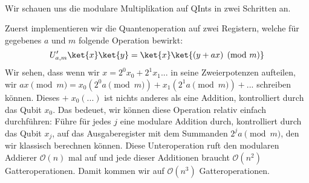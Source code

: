 \paragraph{}

Wir schauen uns die modulare Multiplikation auf QInts in zwei Schritten an.

\noindent Zuerst implementieren wir die Quantenoperation auf zwei Registern, welche für gegebenes $a$ und $m$ folgende Operation bewirkt: $$U'_{a, m}\ket{x}\ket{y} = \ket{x}\ket{(y + ax) \pmod{m}}$$
Wir sehen, dass wenn wir $x = 2^0 x_0 + 2^1 x_1 ...$ in seine Zweierpotenzen aufteilen, wir $ax \pmod{m} = x_0(2^0 a \pmod{m}) + x_1(2^1 a \pmod{m}) + ...$ schreiben können. Dieses $+ \;x_0(...)$ ist nichts anderes als eine Addition, kontrolliert durch das Qubit $x_0$. Das bedeuet, wir können diese Operation relativ einfach durchführen: \newline
Führe für jedes $j$ eine modulare Addition durch, kontrolliert durch das Qubit $x_j$, auf das Ausgaberegister mit dem Summanden $2^ja \pmod{m}$, den wir klassisch berechnen können. \newline
Diese Unteroperation ruft den modularen Addierer $\mathcal O(n)$ mal auf und jede dieser Additionen braucht $\mathcal O(n^2)$ Gatteroperationen. Damit kommen wir auf $\mathcal O(n^3)$ Gatteroperationen.


